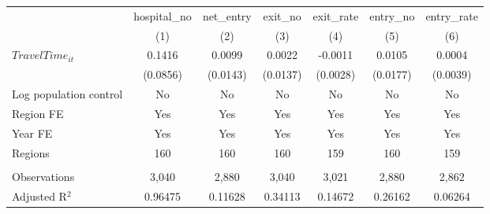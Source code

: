 \begingroup
\centering
\begin{tabular}{lcccccc}
   \toprule
                          & hospital\_no  & net\_entry  & exit\_no  & exit\_rate  & entry\_no  & entry\_rate \\    
                          & (1)           & (2)         & (3)       & (4)         & (5)        & (6)\\  
   \midrule 
   $TravelTime_{it}$      & 0.1416        & 0.0099      & 0.0022    & -0.0011     & 0.0105     & 0.0004\\   
                          & (0.0856)      & (0.0143)    & (0.0137)  & (0.0028)    & (0.0177)   & (0.0039)\\   
   Log population control & No            & No          & No        & No          & No         & No\\  
   Region FE              & Yes           & Yes         & Yes       & Yes         & Yes        & Yes\\  
   Year FE                & Yes           & Yes         & Yes       & Yes         & Yes        & Yes\\  
   Regions                & 160           & 160         & 160       & 159         & 160        & 159\\  
    \\
   Observations           & 3,040         & 2,880       & 3,040     & 3,021       & 2,880      & 2,862\\  
   Adjusted R$^2$         & 0.96475       & 0.11628     & 0.34113   & 0.14672     & 0.26162    & 0.06264\\  
   \bottomrule
\end{tabular}
\par\endgroup
